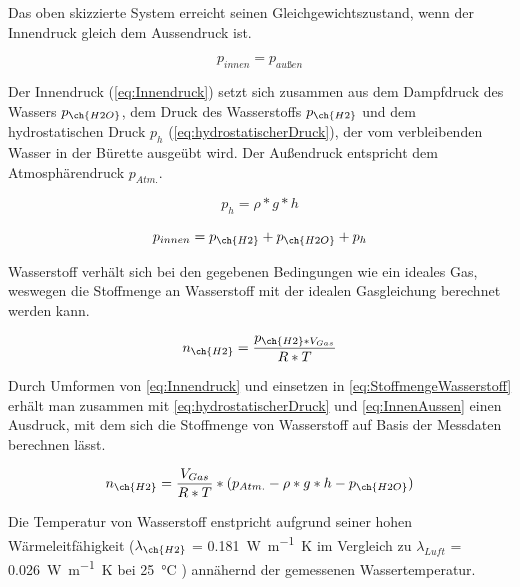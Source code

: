 \documentclass{article}
\begin{document}
      Das oben skizzierte System erreicht seinen Gleichgewichtszustand, wenn der Innendruck gleich dem Aussendruck ist.
    
      \begin{equation}
        p_{innen} = p_{außen} \label{eq:InnenAussen}
      \end{equation}
    
      Der Innendruck (\ref{eq:Innendruck}) setzt sich zusammen aus dem Dampfdruck des Wassers $p_{\ch{H2O}}$, dem Druck des Wasserstoffs $p_{\ch{H2}}$ und dem hydrostatischen Druck $p_{h}$ (\ref{eq:hydrostatischerDruck}), der vom  verbleibenden Wasser in der Bürette ausgeübt wird. Der Außendruck entspricht dem Atmosphärendruck $ p_{Atm.}$.
    
      \begin{equation} 
        p_{h} = \rho * g * h \label{eq:hydrostatischerDruck}
      \end{equation} 
    
      \begin{equation}
        p_{innen} = p_{\ch{H2}} + p_{\ch{H2O}} + p_{h} \label{eq:Innendruck}
      \end{equation}
    
      Wasserstoff verhält sich bei den gegebenen Bedingungen wie ein ideales Gas, weswegen die Stoffmenge an Wasserstoff mit der idealen Gasgleichung berechnet werden kann.
    
      \begin{equation}
        n_{\ch{H2}} = \frac{p_{\ch{H2} * V_{Gas}}}{R*T} \label{eq:StoffmengeWasserstoff}
      \end{equation}     
    
      Durch Umformen von \eqref{eq:Innendruck} und einsetzen in \eqref{eq:StoffmengeWasserstoff} erhält man zusammen mit \eqref{eq:hydrostatischerDruck} und \eqref{eq:InnenAussen} einen Ausdruck, mit dem sich die Stoffmenge von Wasserstoff auf Basis der Messdaten berechnen lässt.
    
    
      \begin{equation}
        n_{\ch{H2}} = \frac{V_{Gas}}{R*T} * (p_{Atm.} - \rho * g * h - p_{\ch{H2O}}) \label{eq:Stoffmenge}
      \end{equation}
      
      Die Temperatur von Wasserstoff enstpricht aufgrund seiner hohen Wärmeleitfähigkeit ($\lambda_{\ch{H2}}$ = \SI[mode=text]{0.181}{\watt\per\meter\kelvin} im Vergleich zu $\lambda_{Luft}$ = \SI[mode=text]{0.026}{\watt\per\meter\kelvin} bei \SI[mode=text]{25}{\degreeCelsius} \cite{LambdaHydrogen}) annähernd der gemessenen Wassertemperatur.
    
\end{document}
